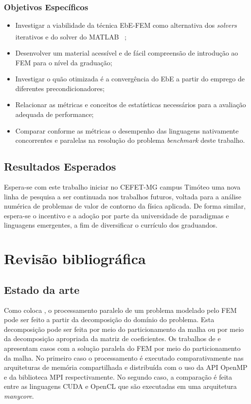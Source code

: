 \documentclass[
    12pt,               %
    openright,          %
    oneside,
    a4paper,            %
    english,            %
    french,             %
    spanish,            %
    brazil              %
    ]{abntex2}
\newcommand{\matlab}{MATLAB\textsuperscript{\textregistered} \ }
\begin{document}
\subsection{Objetivos Específicos}

	\begin{itemize}
		\item Investigar a viabilidade da técnica EbE-FEM como alternativa dos \textit{solvers} iterativos e do solver do  \matlab;
		\item Desenvolver um material acessível e de fácil compreensão de introdução ao FEM para o nível da graduação;
		\item Investigar o quão otimizada é a convergência do EbE a partir do emprego de diferentes precondicionadores;		
		\item Relacionar as métricas e conceitos de estatísticas necessários para a avaliação adequada de performance;
		\item Comparar conforme as métricas o desempenho das linguagens nativamente concorrentes e paralelas na resolução do problema \textit{benchmark} deste trabalho.
	\end{itemize}

\section{Resultados Esperados}

Espera-se com este trabalho iniciar no CEFET-MG campus Timóteo uma nova linha de pesquisa a ser continuada nos trabalhos futuros, voltada para a análise numérica de problemas de valor de contorno da física aplicada. De forma similar, espera-se o incentivo e a adoção por parte da universidade de paradigmas e linguagens emergentes, a fim de diversificar o currículo dos graduandos.


\chapter{Revisão bibliográfica}
\section{Estado da arte}
Como coloca , o processamento paralelo de um problema modelado pelo FEM pode ser feito a partir da decomposição do domínio do problema. Esta decomposição pode ser feita por meio do particionamento da malha  ou por meio da decomposição apropriada da matriz de coeficientes.
Os trabalhos de  e  apresentam casos com a solução paralela do FEM por meio do particionamento da malha. No primeiro caso o processamento é executado comparativamente nas arquiteturas de memória compartilhada e distribuída com o uso da API OpenMP e da biblioteca MPI respectivamente.
No segundo caso, a comparação é feita entre as linguagens CUDA e OpenCL que são executadas em uma arquitetura \textit{manycore}. 
\end{document}
